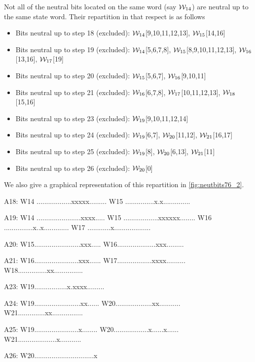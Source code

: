 Not all of the neutral bits located on the same word (say $\mathcal{W}_{14}$) are neutral up to the same state word. Their repartition
in that respect is as follows
\begin{itemize}
	\item Bits neutral up to step 18 (excluded): $\mathcal{W}_{14}$[9,10,11,12,13], $\mathcal{W}_{15}$[14,16]
	\item Bits neutral up to step 19 (excluded): $\mathcal{W}_{14}$[5,6,7,8], $\mathcal{W}_{15}$[8,9,10,11,12,13], $\mathcal{W}_{16}$[13,16], $\mathcal{W}_{17}$[19]
	\item Bits neutral up to step 20 (excluded): $\mathcal{W}_{15}$[5,6,7], $\mathcal{W}_{16}$[9,10,11]
	\item Bits neutral up to step 21 (excluded): $\mathcal{W}_{16}$[6,7,8], $\mathcal{W}_{17}$[10,11,12,13], $\mathcal{W}_{18}$[15,16]
	\item Bits neutral up to step 23 (excluded): $\mathcal{W}_{19}$[9,10,11,12,14]
	\item Bits neutral up to step 24 (excluded): $\mathcal{W}_{19}$[6,7], $\mathcal{W}_{20}$[11,12], $\mathcal{W}_{21}$[16,17]
	\item Bits neutral up to step 25 (excluded): $\mathcal{W}_{19}$[8], $\mathcal{W}_{20}$[6,13], $\mathcal{W}_{21}$[11]
	\item Bits neutral up to step 26 (excluded): $\mathcal{W}_{20}$[0]
\end{itemize}
We also give a graphical representation of this repartition in \autoref{fig:neutbits76_2}.

\begin{verbbox}
A18:
W14 ..................xxxxx.........
W15 ...............x.x..............

A19:
W14 .......................xxxx.....
W15 ..................xxxxxx........
W16 ...............x..x.............
W17 ............x...................

A20:
W15........................xxx.....
W16....................xxx.........

A21:
W16.......................xxx......
W17..................xxxx..........
W18...............xx...............

A23:
W19.................x.xxxx.........

A24:
W19........................xx......
W20...................xx...........
W21..............xx................

A25:
W19.......................x........
W20..................x......x......
W21....................x...........

A26:
W20...............................x
\end{verbbox}

